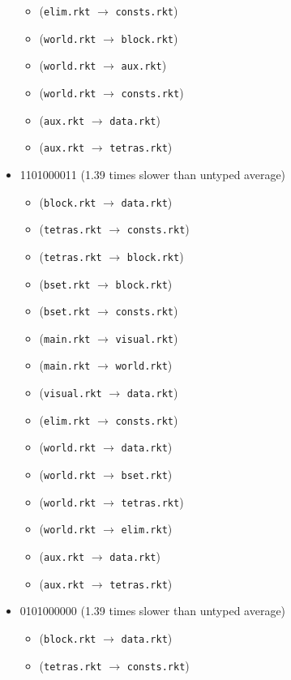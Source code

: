 \documentclass{article}
\newcommand{\mono}[1]{\texttt{#1}}
\begin{document}
\begin{itemize}
\begin{itemize}
  \item (\mono{elim.rkt} $\rightarrow$ \mono{consts.rkt})
  \item (\mono{world.rkt} $\rightarrow$ \mono{block.rkt})
  \item (\mono{world.rkt} $\rightarrow$ \mono{aux.rkt})
  \item (\mono{world.rkt} $\rightarrow$ \mono{consts.rkt})
  \item (\mono{aux.rkt} $\rightarrow$ \mono{data.rkt})
  \item (\mono{aux.rkt} $\rightarrow$ \mono{tetras.rkt})
  \end{itemize}
\item 1101000011 (1.39 times slower than untyped average)
  \begin{itemize}
  \item (\mono{block.rkt} $\rightarrow$ \mono{data.rkt})
  \item (\mono{tetras.rkt} $\rightarrow$ \mono{consts.rkt})
  \item (\mono{tetras.rkt} $\rightarrow$ \mono{block.rkt})
  \item (\mono{bset.rkt} $\rightarrow$ \mono{block.rkt})
  \item (\mono{bset.rkt} $\rightarrow$ \mono{consts.rkt})
  \item (\mono{main.rkt} $\rightarrow$ \mono{visual.rkt})
  \item (\mono{main.rkt} $\rightarrow$ \mono{world.rkt})
  \item (\mono{visual.rkt} $\rightarrow$ \mono{data.rkt})
  \item (\mono{elim.rkt} $\rightarrow$ \mono{consts.rkt})
  \item (\mono{world.rkt} $\rightarrow$ \mono{data.rkt})
  \item (\mono{world.rkt} $\rightarrow$ \mono{bset.rkt})
  \item (\mono{world.rkt} $\rightarrow$ \mono{tetras.rkt})
  \item (\mono{world.rkt} $\rightarrow$ \mono{elim.rkt})
  \item (\mono{aux.rkt} $\rightarrow$ \mono{data.rkt})
  \item (\mono{aux.rkt} $\rightarrow$ \mono{tetras.rkt})
  \end{itemize}
\item 0101000000 (1.39 times slower than untyped average)
  \begin{itemize}
  \item (\mono{block.rkt} $\rightarrow$ \mono{data.rkt})
  \item (\mono{tetras.rkt} $\rightarrow$ \mono{consts.rkt})

\end{itemize}
\end{itemize}
\end{document}
